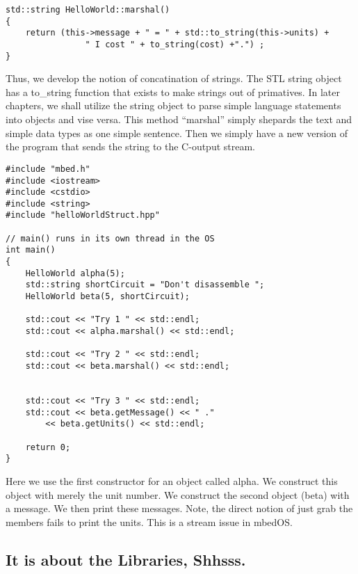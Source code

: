 \documentclass{article}
\begin{document}
\begin{lstlisting}
std::string HelloWorld::marshal()
{
    return (this->message + " = " + std::to_string(this->units) + 
				" I cost " + to_string(cost) +".") ;
}
\end{lstlisting}

Thus, we develop the notion of concatination of strings.  The STL string object has a to\_string function that exists to make strings out of primatives.   In later chapters, we shall utilize the string object to parse simple language statements into objects and vise versa.  This method ``marshal'' simply shepards the text and simple data types as one simple sentence.  
\newpage
Then we simply have a new version of the program that sends the string to the C-output stream.  
\begin{lstlisting}
#include "mbed.h"
#include <iostream>
#include <cstdio>
#include <string>
#include "helloWorldStruct.hpp"

// main() runs in its own thread in the OS
int main()
{
    HelloWorld alpha(5);
    std::string shortCircuit = "Don't disassemble ";
    HelloWorld beta(5, shortCircuit);

    std::cout << "Try 1 " << std::endl;
    std::cout << alpha.marshal() << std::endl;

    std::cout << "Try 2 " << std::endl;
    std::cout << beta.marshal() << std::endl; 
		

    std::cout << "Try 3 " << std::endl;
    std::cout << beta.getMessage() << " ." 
		<< beta.getUnits() << std::endl;

	return 0;
}
\end{lstlisting}
Here we use the first constructor for an object called alpha.  We construct this object with merely the unit number.  We construct the second object (beta) with a message.   We then print these messages.  Note, the direct notion of just grab the members fails to print the units.  This is a stream issue in mbedOS.  








\newpage
\subsection{It is about the Libraries, Shhsss.} %
\label{sub:it_is_about_the_libraries_shhsss}
\end{document}
